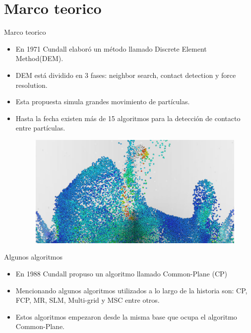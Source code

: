 \documentclass[11pt]{beamer}
\begin{document}
\section{Marco teorico}
\begin{frame}{Marco teorico}
 \begin{itemize}
  \item En 1971 Cundall \cite{1988-Cundall} elaboró un método llamado Discrete Element Method(DEM).
  \item DEM está dividido en 3 fases: neighbor search, contact detection y force resolution.  
  \item Esta propuesta simula grandes movimiento de partículas.
  \item Hasta la fecha existen más de 15 algoritmos para la detección de contacto entre partículas.
  \begin{figure}[\centering]
    \includegraphics[width = 0.6\linewidth]{img/DEM}
  \end{figure}

 \end{itemize}
\end{frame}

\begin{frame}{Algunos algoritmos}
 \begin{itemize}
  \item En 1988 Cundall\cite{1988-Cundall} propuso un algoritmo llamado Common-Plane (CP)
  \item Mencionando algunos algoritmos utilizados a lo largo de la historia son: CP, FCP, MR, SLM, Multi-grid y MSC entre otros.
  \item Estos algoritmos empezaron desde la misma base que ocupa el algoritmo Common-Plane.
 \end{itemize}
\end{frame}
\end{document}
